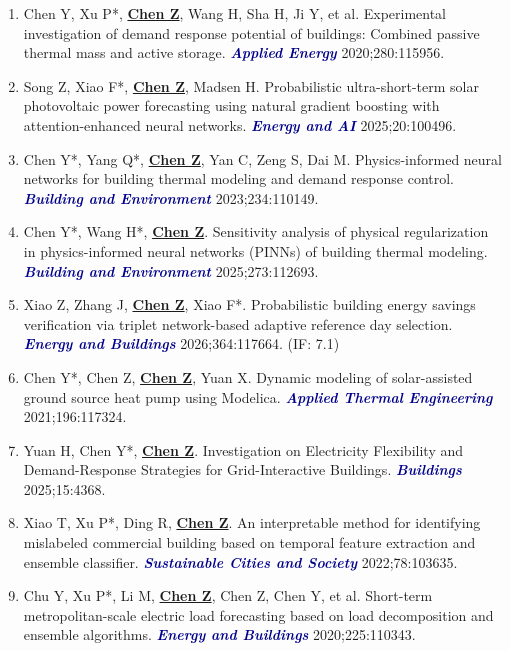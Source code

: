 \documentclass[11pt,a4paper]{article}
\newcommand{\me}[1]{\underline{\textbf{#1}}}
\newcommand{\journal}[1]{\textcolor{darkblue}{\textbf{\textit{#1}}}}
\begin{document}
\begin{enumerate}
\item Chen Y, Xu P*, \me{Chen Z}, Wang H, Sha H, Ji Y, et al. Experimental investigation of demand response potential of buildings: Combined passive thermal mass and active storage. \journal{Applied Energy} 2020;280:115956.

\item Song Z, Xiao F*, \me{Chen Z}, Madsen H. Probabilistic ultra-short-term solar photovoltaic power forecasting using natural gradient boosting with attention-enhanced neural networks. \journal{Energy and AI} 2025;20:100496.

\item Chen Y*, Yang Q*, \me{Chen Z}, Yan C, Zeng S, Dai M. Physics-informed neural networks for building thermal modeling and demand response control. \journal{Building and Environment} 2023;234:110149.

\item Chen Y*, Wang H*, \me{Chen Z}. Sensitivity analysis of physical regularization in physics-informed neural networks (PINNs) of building thermal modeling. \journal{Building and Environment} 2025;273:112693.

\item Xiao Z, Zhang J, \me{Chen Z}, Xiao F*. Probabilistic building energy savings verification via triplet network-based adaptive reference day selection. \journal{Energy and Buildings} 2026;364:117664. (IF: 7.1)

\item Chen Y*, Chen Z, \me{Chen Z}, Yuan X. Dynamic modeling of solar-assisted ground source heat pump using Modelica. \journal{Applied Thermal Engineering} 2021;196:117324.

\item Yuan H, Chen Y*, \me{Chen Z}. Investigation on Electricity Flexibility and Demand-Response Strategies for Grid-Interactive Buildings. \journal{Buildings} 2025;15:4368.

\item Xiao T, Xu P*, Ding R, \me{Chen Z}. An interpretable method for identifying mislabeled commercial building based on temporal feature extraction and ensemble classifier. \journal{Sustainable Cities and Society} 2022;78:103635.

\item Chu Y, Xu P*, Li M, \me{Chen Z}, Chen Z, Chen Y, et al. Short-term metropolitan-scale electric load forecasting based on load decomposition and ensemble algorithms. \journal{Energy and Buildings} 2020;225:110343.


\end{enumerate}
\end{document}
